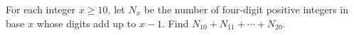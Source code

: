 For each integer $x\ge10$, let $N_x$ be the number of four-digit positive integers in base $x$ whose digits add up to $x-1$. Find $N_{10}+N_{11}+\cdots+N_{20}$.
